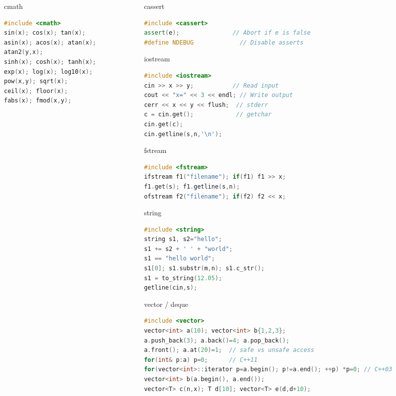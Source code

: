 \documentclass[final]{beamer}
\begin{document}
\begin{frame}[t,fragile]
\begin{columns}[t,totalwidth=\paperwidth, colsep=0.015\paperwidth]
\begin{column}{0.32\paperwidth}
\begin{block}{cmath}
\begin{lstlisting}[language=C++]
#include <cmath>
sin(x); cos(x); tan(x);
asin(x); acos(x); atan(x);
atan2(y,x);
sinh(x); cosh(x); tanh(x);
exp(x); log(x); log10(x);
pow(x,y); sqrt(x);
ceil(x); floor(x);
fabs(x); fmod(x,y);
\end{lstlisting}


\end{block}

\end{column}

\begin{column}{0.32\paperwidth}

\begin{block}{cassert}
\begin{lstlisting}[language=C++]
#include <cassert>
assert(e);               // Abort if e is false
#define NDEBUG             // Disable asserts
\end{lstlisting}
\end{block}

\begin{block}{iostream}
\begin{lstlisting}[language=C++]
#include <iostream>
cin >> x >> y;           // Read input
cout << "x=" << 3 << endl; // Write output
cerr << x << y << flush;  // stderr
c = cin.get();            // getchar
cin.get(c);
cin.getline(s,n,'\n');
\end{lstlisting}
\end{block}

\begin{block}{fstream}
\begin{lstlisting}[language=C++]
#include <fstream>
ifstream f1("filename"); if(f1) f1 >> x;
f1.get(s); f1.getline(s,n);
ofstream f2("filename"); if(f2) f2 << x;
\end{lstlisting}
\end{block}

\begin{block}{string}
\begin{lstlisting}[language=C++]
#include <string>
string s1, s2="hello";
s1 += s2 + ' ' + "world";
s1 == "hello world";
s1[0]; s1.substr(m,n); s1.c_str();
s1 = to_string(12.05);
getline(cin,s);
\end{lstlisting}
\end{block}

\begin{block}{vector / deque}
\begin{lstlisting}[language=C++]
#include <vector>
vector<int> a(10); vector<int> b{1,2,3};
a.push_back(3); a.back()=4; a.pop_back();
a.front(); a.at(20)=1;  // safe vs unsafe access
for(int& p:a) p=0;      // C++11
for(vector<int>::iterator p=a.begin(); p!=a.end(); ++p) *p=0; // C++03
vector<int> b(a.begin(), a.end());
vector<T> c(n,x); T d[10]; vector<T> e(d,d+10);


\end{lstlisting}
\end{block}
\end{column}
\end{columns}
\end{frame}
\end{document}
